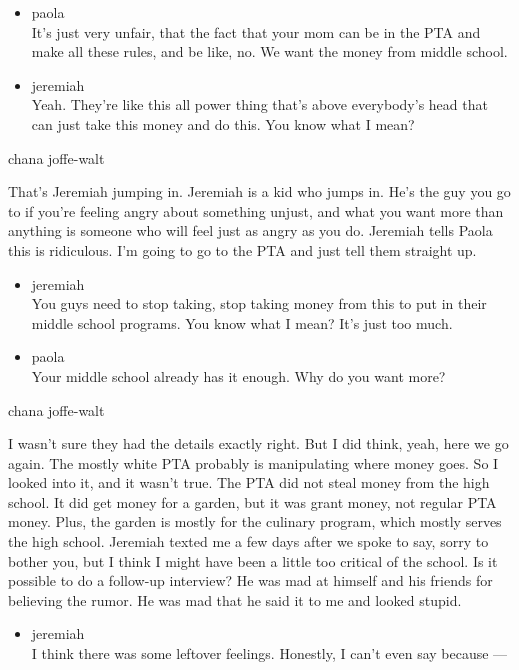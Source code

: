 \begin{itemize}
\item
  paola\\
  It's just very unfair, that the fact that your mom can be in the PTA
  and make all these rules, and be like, no. We want the money from
  middle school.
\item
  jeremiah\\
  Yeah. They're like this all power thing that's above everybody's head
  that can just take this money and do this. You know what I mean?
\end{itemize}

chana joffe-walt

That's Jeremiah jumping in. Jeremiah is a kid who jumps in. He's the guy
you go to if you're feeling angry about something unjust, and what you
want more than anything is someone who will feel just as angry as you
do. Jeremiah tells Paola this is ridiculous. I'm going to go to the PTA
and just tell them straight up.

\begin{itemize}
\item
  jeremiah\\
  You guys need to stop taking, stop taking money from this to put in
  their middle school programs. You know what I mean? It's just too
  much.
\item
  paola\\
  Your middle school already has it enough. Why do you want more?
\end{itemize}

chana joffe-walt

I wasn't sure they had the details exactly right. But I did think, yeah,
here we go again. The mostly white PTA probably is manipulating where
money goes. So I looked into it, and it wasn't true. The PTA did not
steal money from the high school. It did get money for a garden, but it
was grant money, not regular PTA money. Plus, the garden is mostly for
the culinary program, which mostly serves the high school. Jeremiah
texted me a few days after we spoke to say, sorry to bother you, but I
think I might have been a little too critical of the school. Is it
possible to do a follow-up interview? He was mad at himself and his
friends for believing the rumor. He was mad that he said it to me and
looked stupid.

\begin{itemize}
\tightlist
\item
  jeremiah\\
  I think there was some leftover feelings. Honestly, I can't even say
  because ---
\end{itemize}


